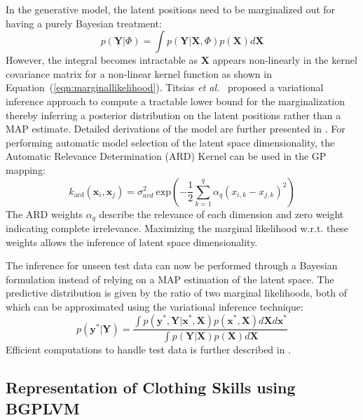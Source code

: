 \documentclass[a4paper]{article}
\begin{document}
In the generative model, the latent positions need to be marginalized out for having a purely Bayesian treatment:
\begin{equation}
  \label{eqn:marginalization}
  p(\mathbf{Y}|\Phi) = \int p(\mathbf{Y}|\mathbf{X},\Phi) p(\mathbf{X}) d\mathbf{X}
\end{equation}
However, the integral becomes intractable as $\mathbf{X}$ appears non-linearly in the kernel covariance matrix for a non-linear kernel function as shown in Equation~(\ref{eqn:marginallikelihood}). Titsias \emph{et al.}~\cite{bgplvm} proposed a variational inference approach to compute a tractable lower bound for the marginalization thereby inferring a posterior distribution on the latent positions rather than a MAP estimate. Detailed derivations of the model are further presented in \cite{bgplvm}. For performing automatic model selection of the latent space dimensionality, the Automatic Relevance Determination (ARD) Kernel can be used in the GP mapping:
\begin{equation}
  \label{eqn:ardkernel}
  k_{\text{ard}}(\mathbf{x}_i,\mathbf{x}_j) = \sigma_{ard}^2~\text{exp}\left( - \frac{1}{2} \sum_{k=1}^q{\alpha_q (x_{i,k} - x_{j,k})^2}\right)
\end{equation}
The ARD weights $\alpha_q$ describe the relevance of each dimension and zero weight indicating complete irrelevance. Maximizing the marginal likelihood w.r.t. these weights allows the inference of latent space dimensionality.

The inference for unseen test data can now be performed through a Bayesian formulation instead of relying on a MAP estimation of the latent space. The predictive distribution is given by the ratio of two marginal likelihoods, both of which can be approximated using the variational inference technique:
\begin{equation}
	\label{eqn:testinference}
	p(\mathbf{y}^*|\mathbf{Y}) = \frac{\int p(\mathbf{y}^*,\mathbf{Y}|\mathbf{x}^*,\mathbf{X})p(\mathbf{x}^*,\mathbf{X})d\mathbf{X}d\mathbf{x}^*}{\int p(\mathbf{Y}|\mathbf{X})p(\mathbf{X})d\mathbf{X}}
\end{equation}
Efficient computations to handle test data is further described in \cite{bgplvm}.

\subsection{Representation of Clothing Skills using BGPLVM}
\label{section:clothassist}
\end{document}

